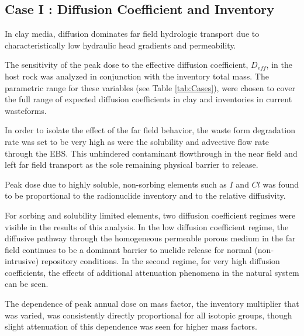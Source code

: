 
\subsection{Case I : Diffusion Coefficient and Inventory }
\label{sec:diffusivity}

In clay media, diffusion dominates far field hydrologic transport due to 
characteristically low hydraulic head gradients and permeability. 

The sensitivity of the peak dose to the effective diffusion coefficient, 
$D_{eff}$, in the host rock was analyzed in conjunction with the inventory 
total mass. The parametric range for these variables (see Table 
\ref{tab:Cases}), were chosen to cover the full range of expected diffusion 
coefficients in clay and inventories in current wasteforms.

In order to isolate the effect of the far field behavior, the waste form 
degradation rate was set to be very high as were the solubility and advective 
flow rate through the  \gls{EBS}. This unhindered contaminant flowthrough 
in the near field and left far field transport as the sole remaining physical 
barrier to release.

Peak dose due to highly soluble, non-sorbing elements such as $I$ and $Cl$ 
was found to be proportional to the radionuclide inventory and 
to the relative diffusivity. 

For sorbing and solubility limited elements,
two diffusion coefficient regimes were visible in the results of this analysis. 
In the low diffusion coefficient regime, the diffusive pathway through the 
homogeneous permeable porous medium in the far field continues to be a  dominant 
barrier to nuclide release for normal (non-intrusive) repository conditions.  
In the second regime, for very high diffusion coefficients, the effects of 
additional attenuation phenomena in the natural system can be seen. 

The dependence of peak annual dose on mass factor, the inventory multiplier that 
was varied, was consistently directly 
proportional for all isotopic groups, though slight attenuation of this 
dependence was seen for higher mass factors.
